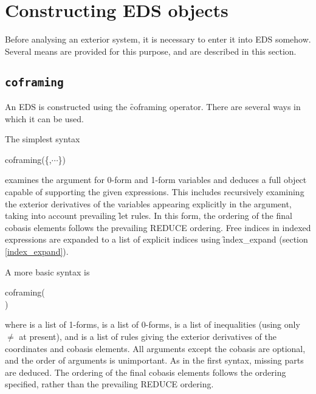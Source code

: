 
\section{Constructing EDS objects}
\label{Constructing EDS objects}

Before analysing an exterior system, it is necessary to enter it into EDS
somehow. Several means are provided for this purpose, and are described in
this section.

\subsection{\tt coframing}
\label{coframing}

An EDS  is constructed using the \f{coframing}
operator. There are several ways in which it can be used. 

The simplest syntax
\begin{syntax}
	coframing(\{,$\cdots$\})
\end{syntax}
examines the argument for 0-form and 1-form variables and deduces a full
 object capable of supporting the given expressions. This
includes recursively examining the exterior derivatives of the variables
appearing explicitly in the argument, taking into account prevailing
\f{let} rules. In this form, the ordering of the final cobasis elements
follows the prevailing REDUCE ordering. Free indices in indexed expressions
are expanded to a list of explicit indices using \f{index\_expand} (section
\ref{index_expand}).

A more basic syntax is
\begin{syntax}
	coframing(
	\\\phantom \qquad\qquad\quad
	)
\end{syntax}
where  is a list of  1-forms,
 is a list of  0-forms,
 is a list of inequalities (using only $\neq$ at
present), and  is a list of rules giving the
exterior derivatives of the coordinates and cobasis elements. All
arguments except the cobasis are optional, and the order of arguments is
unimportant. As in the first syntax, missing parts are deduced. The
ordering of the final cobasis elements follows the ordering specified,
rather than the prevailing REDUCE ordering. 

